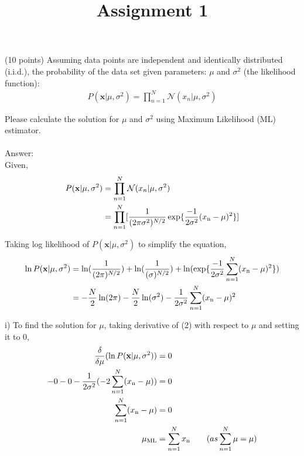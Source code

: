 \documentclass{exam}
\title{Assignment 1}
\date{}
\begin{document}
\maketitle
\thispagestyle{headandfoot}

\begin{center}
  {}
\end{center}
\vspace{.5cm}
\begin{questions}

 (10 points) Assuming data points are independent and identically distributed (i.i.d.), the probability of the data set given parameters: $\mu$ and $\sigma^2$ (the likelihood function):
\begin{align}
\nonumber P(\mathbf{x}|\mu,\sigma^2) = \prod_{n=1}^N\mathcal{N}(x_n|\mu,\sigma^2)
\end{align}

Please calculate the solution for $\mu$ and $\sigma^2$ using Maximum Likelihood (ML) estimator. \\ \\
Answer:\\ 

Given,
\begin{align}
\nonumber P(\mathbf{x}|\mu,\sigma^2) &= \prod_{n=1}^N\mathcal{N}(x_n|\mu,\sigma^2) \\
&= \prod_{n=1}^N[\frac{1}{(2\pi\sigma^2)^{N/2}} \exp\{\frac{-1}{2\sigma^2}(x\textsubscript{n} - \mu)^2\}]
\end{align}

Taking log likelihood of $ P(\mathbf{x}|\mu,\sigma^2)$ to simplify the equation,
\begin{align}
\nonumber \ln P(\mathbf{x}|\mu,\sigma^2) &=  \ln(\frac{1}{(2\pi)^{N/2}}) + \ln(\frac{1}{(\sigma)^{N/2}}) + 
\ln(\exp\{\frac{-1}{2\sigma^2}\sum_{n=1}^N(x\textsubscript{n} - \mu)^2\}) \\
&= -\frac{N}{2}\ln(2\pi)-\frac{N}{2}\ln(\sigma^2)-\frac{1}{2\sigma^2}\sum_{n=1}^N(x\textsubscript{n} - \mu)^2
\end{align}

i) To find the solution for $\mu$, taking derivative of (2) with respect to $\mu$ and setting it to 0,
\begin{align}
\frac{\delta}{\delta\mu}(\ln P(\mathbf{x}|\mu,\sigma^2)) &= 0\\
-0-0-\frac{1}{2\sigma^2}(-2 \sum_{n=1}^N(x\textsubscript{n}-\mu)) &= 0\\
\sum_{n=1}^N(x\textsubscript{n}-\mu) &= 0\\
\mu\textsubscript{ML} &= \sum_{n=1}^Nx\textsubscript{n} \quad\quad(as \sum_{n=1}^N\mu = \mu)
\end{align}


\end{questions}
\end{document}
